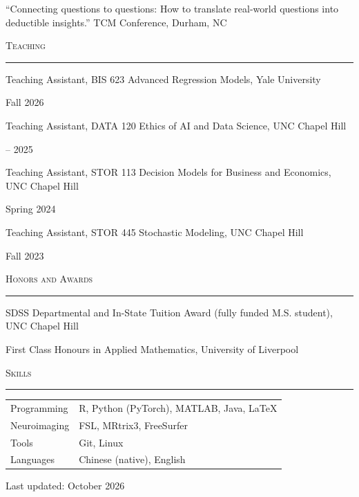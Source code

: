\documentclass[11pt,letterpaper]{article}
\newcommand{\cvsection}[1]{%
  \vspace{14pt}%
  {\large\scshape #1}\par
  \vspace{-4pt}\rule{\linewidth}{0.5pt}\par
  \vspace{4pt}}
\newcommand{\cvline}[2]{%
  \parbox[t]{\dimexpr\linewidth-6.5em\relax}{\raggedright #1}\hfill
  \parbox[t]{6.3em}{\raggedleft #2}\par\vspace{3pt}}
\begin{document}
\cvline{``Connecting questions to questions: How to translate real-world questions into
  deductible insights.'' TCM Conference, Durham, NC}{2024}

\cvsection{Teaching}

\cvline{Teaching Assistant, BIS 623 Advanced Regression Models, Yale University}{Fall 2026}
\cvline{Teaching Assistant, DATA 120 Ethics of AI and Data Science, UNC Chapel Hill}{2024 -- 2025}
\cvline{Teaching Assistant, STOR 113 Decision Models for Business and Economics, UNC Chapel Hill}{Spring 2024}
\cvline{Teaching Assistant, STOR 445 Stochastic Modeling, UNC Chapel Hill}{Fall 2023}

\cvsection{Honors and Awards}

\cvline{SDSS Departmental and In-State Tuition Award (fully funded M.S. student), UNC Chapel Hill}{2024}
\cvline{First Class Honours in Applied Mathematics, University of Liverpool}{2023}

\cvsection{Skills}

\begin{tabular}{@{}ll@{}}
  Programming   & R, Python (PyTorch), MATLAB, Java, LaTeX \\
  Neuroimaging  & FSL, MRtrix3, FreeSurfer \\
  Tools         & Git, Linux \\
  Languages     & Chinese (native), English \\
\end{tabular}

\vfill
{\footnotesize Last updated: October 2026}
\end{document}
